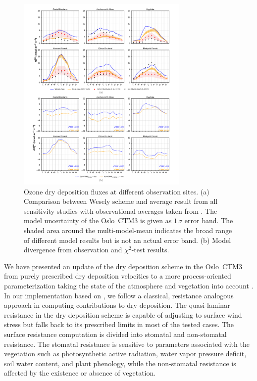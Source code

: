 \documentclass[gmd, manuscript]{copernicus}
\begin{document}
%
\begin{figure}[t]
  \includegraphics[width=8.3cm]{fig09}
  \caption{Ozone dry deposition fluxes at different observation sites. (a) Comparison between Wesely scheme and average result from all sensitivity studies with observational averages taken from \citet{ACP:Hardacre2015}. The model uncertainty of the Oslo~CTM3 is given as $1\,\sigma$ error band. The shaded area around the multi-model-mean indicates the broad range of different model results but is not an actual error band. (b) Model divergence from observation and $\chi^2$-test results.}
  \label{fig:mmm_drydep_stations}
\end{figure}

\label{sec:conc}
We have presented an update of the dry deposition scheme in the Oslo~CTM3 from purely prescribed dry deposition velocities \citep{AE:Wesely1989,JGR:Hough1991} to a more process-oriented parameterization taking the state of the atmosphere and vegetation into account \citep{ACP:Simpson2012}. In our implementation based on \citet{ACP:Simpson2012}, we follow a classical, resistance analogous approach in computing contributions to dry deposition. The quasi-laminar resistance in the dry deposition scheme is capable of adjusting to surface wind stress but falls back to its prescribed limits in most of the tested cases. The surface resistance computation is divided into stomatal and non-stomatal resistance. The stomatal resistance is sensitive to parameters associated with the vegetation such as photosynthetic active radiation, water vapor pressure deficit, soil water content, and plant phenology, while the non-stomatal resistance is affected by the existence or absence of vegetation.
\end{document}
